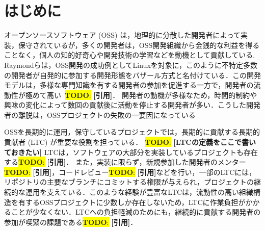 \documentclass[submit,techrep,noauthor]{ipsj}
\newcommand{\todo}[1]{\colorbox{yellow}{{\bf TODO}:}{\color{red} {\textbf{[#1]}}}}
\begin{document}
\maketitle

\section{はじめに}
オープンソースソフトウェア (OSS) は，地理的に分散した開発者によって実装，保守されているが，多くの開発者は，OSS開発組織から金銭的な利益を得ることなく，個人の知的好奇心や開発技術の学習などを動機として貢献している\cite{motivation}.
Raymondらは，OSS開発の成功例としてLinuxを対象に，このように不特定多数の開発者が自発的に参加する開発形態をバザール方式と名付けている\cite{bazaar}．この開発モデルは，多様な専門知識を有する開発者の参加を促進する一方で，開発者の流動性が極めて高い~\todo{引用}．
開発者の動機が多様なため，時間的制約や興味の変化によって数回の貢献後に活動を停止する開発者が多い\cite{OTC}．こうした開発者の離脱は，OSSプロジェクトの失敗の一要因になっている\cite{failed}



OSSを長期的に運用，保守しているプロジェクトでは，長期的に貢献する長期的貢献者 (LTC) が重要な役割を担っている\cite{related1}．
\todo{LTCの定義をここで書いておきたい}
LTCは，ソフトウェアの大部分を実装しているプロジェクトも存在する\todo{引用}．
また，実装に限らず，新規参加した開発者のメンター\todo{引用}，コードレビュー\todo{引用}などを行い，一部のLTCには，リポジトリの主要なブランチにコミットする権限が与えられ，プロジェクトの継続的な運用を支えている．このような経験が豊富なLTCは，流動性の高い組織構造を有するOSSプロジェクトに少数しか存在しないため，LTCに作業負担がかかることが少なくない\cite{related2}．LTCへの負担軽減のためにも，継続的に貢献する開発者の参加が喫緊の課題である\todo{引用}．
\end{document}
